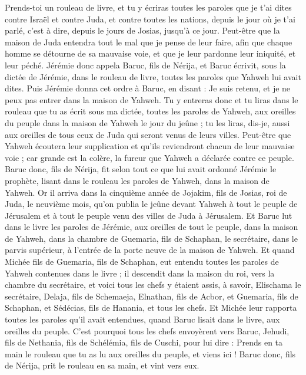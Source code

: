 \begin{multicols}{2}
Prends-toi un rouleau de livre, et tu y écriras toutes les paroles que je t'ai dites contre Israël et contre Juda, et contre toutes les nations, depuis le jour où je t'ai parlé, c'est à dire, depuis le jours de Josias, jusqu'à ce jour.
Peut-être que la maison de Juda entendra tout le mal que je pense de leur faire, afin que chaque homme se détourne de sa mauvaise voie, et que je leur pardonne leur iniquité, et leur péché.
Jérémie donc appela Baruc, fils de Nérija, et Baruc écrivit, sous la dictée de Jérémie, dans le rouleau de livre, toutes les paroles que Yahweh lui avait dites.
Puis Jérémie donna cet ordre à Baruc, en disant : Je suis retenu, et je ne peux pas entrer dans la maison de Yahweh.
Tu y entreras donc et tu liras dans le rouleau que tu as écrit sous ma dictée, toutes les paroles de Yahweh, aux oreilles du peuple dans la maison de Yahweh le jour du jeûne ; tu les liras, dis-je, aussi aux oreilles de tous ceux de Juda qui seront venus de leurs villes.
Peut-être que Yahweh écoutera leur supplication et qu'ils reviendront chacun de leur mauvaise voie ; car grande est la colère, la fureur que Yahweh a déclarée contre ce peuple.
Baruc donc, fils de Nérija, fit selon tout ce que lui avait ordonné Jérémie le prophète, lisant dans le rouleau les paroles de Yahweh, dans la maison de Yahweh.
Or il arriva dans la cinquième année de Jojakim, fils de Josias, roi de Juda, le neuvième mois, qu'on publia le jeûne devant Yahweh à tout le peuple de Jérusalem et à tout le peuple venu des villes de Juda à Jérusalem.
Et Baruc lut dans le livre les paroles de Jérémie, aux oreilles de tout le peuple, dans la maison de Yahweh, dans la chambre de Guemaria, fils de Schaphan, le secrétaire, dans le parvis supérieur, à l'entrée de la porte neuve de la maison de Yahweh.
Et quand Michée fils de Guemaria, fils de Schaphan, eut entendu toutes les paroles de Yahweh contenues dans le livre ;
il descendit dans la maison du roi, vers la chambre du secrétaire, et voici tous les chefs y étaient assis, à savoir, Elischama le secrétaire, Delaja, fils de Schemaeja, Elnathan, fils de Acbor, et Guemaria, fils de Schaphan, et Sédécias, fils de Hanania, et tous les chefs.
Et Michée leur rapporta toutes les paroles qu'il avait entendues, quand Baruc lisait dans le livre, aux oreilles du peuple.
C'est pourquoi tous les chefs envoyèrent vers Baruc, Jehudi, fils de Nethania, fils de Schélémia, fils de Cuschi, pour lui dire : Prends en ta main le rouleau que tu as lu aux oreilles du peuple, et viens ici ! Baruc donc, fils de Nérija, prit le rouleau en sa main, et vint vers eux.

\end{multicols}

